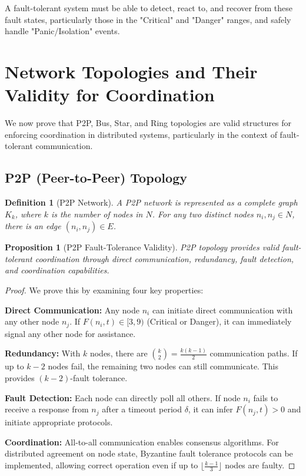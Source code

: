 \documentclass{article}
\newtheorem{proposition}[theorem]{Proposition}
\newtheorem{definition}{Definition}
\begin{document}
A fault-tolerant system must be able to detect, react to, and recover from these fault states, particularly those in the "Critical" and "Danger" ranges, and safely handle "Panic/Isolation" events.

\section{Network Topologies and Their Validity for Coordination}

We now prove that P2P, Bus, Star, and Ring topologies are valid structures for enforcing coordination in distributed systems, particularly in the context of fault-tolerant communication.

\subsection{P2P (Peer-to-Peer) Topology}

\begin{definition}[P2P Network]
A P2P network is represented as a complete graph $K_k$, where $k$ is the number of nodes in $N$. For any two distinct nodes $n_i, n_j \in N$, there is an edge $(n_i, n_j) \in E$.
\end{definition}

\begin{proposition}[P2P Fault-Tolerance Validity]
P2P topology provides valid fault-tolerant coordination through direct communication, redundancy, fault detection, and coordination capabilities.
\end{proposition}

\begin{proof}
We prove this by examining four key properties:

\textbf{Direct Communication:} Any node $n_i$ can initiate direct communication with any other node $n_j$. If $F(n_i, t) \in [3, 9)$ (Critical or Danger), it can immediately signal any other node for assistance.

\textbf{Redundancy:} With $k$ nodes, there are $\binom{k}{2} = \frac{k(k-1)}{2}$ communication paths. If up to $k-2$ nodes fail, the remaining two nodes can still communicate. This provides $(k-2)$-fault tolerance.

\textbf{Fault Detection:} Each node can directly poll all others. If node $n_i$ fails to receive a response from $n_j$ after a timeout period $\delta$, it can infer $F(n_j, t) > 0$ and initiate appropriate protocols.

\textbf{Coordination:} All-to-all communication enables consensus algorithms. For distributed agreement on node state, Byzantine fault tolerance protocols can be implemented, allowing correct operation even if up to $\lfloor\frac{k-1}{3}\rfloor$ nodes are faulty.
\end{proof}
\end{document}
